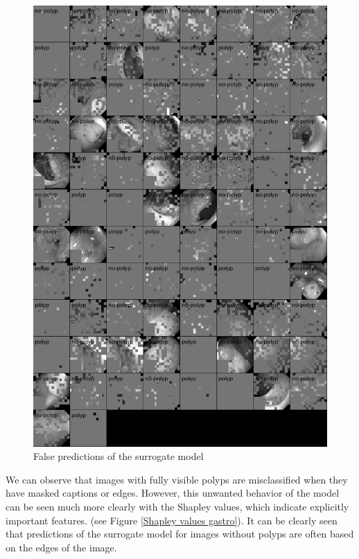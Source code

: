 \documentclass[magisterska,en]{pracamgr}
\begin{document}
\begin{figure}[H]
\centering
\includegraphics[scale=0.4]{./images/gastro_false_surrogate.png}
\caption{False predictions of the surrogate model}
\label{gastro_vit_masked}
\end{figure}


We can observe that images with fully visible polyps are misclassified when they have masked captions or edges.
However, this unwanted behavior of the model can be seen much more clearly with the Shapley values, which indicate explicitly important features.
(see Figure \ref{Shapley values gastro}). It can be clearly seen that predictions of the surrogate model for images without polyps are often based on the edges of the image.
\end{document}
